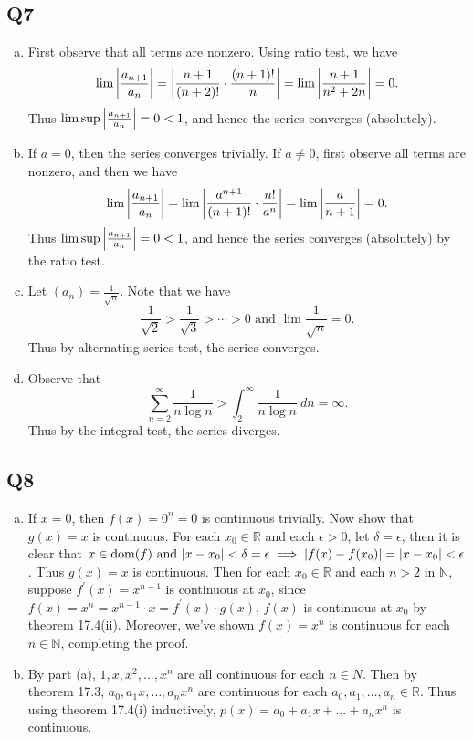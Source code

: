 \documentclass[12pt,lettersize]{article}
\newcommand{\R}{\mathbb{R}}
\newcommand{\N}{\mathbb{N}}
\DeclareMathOperator{\dom}{dom}
\begin{document}
	\subsection*{Q7}
	\begin{enumerate}[(a)]
		\item First observe that all terms are nonzero. Using ratio test, we have
		\begin{displaymath}
			\lim\abs{\frac{a_{n+1}}{a_n}}=\abs{\frac{n+1}{(n+2)!}\cdot\frac{(n+1)!}{n}}=\lim\abs{\frac{n+1}{n^2+2n}}=0.
		\end{displaymath}
		Thus $\lim\sup\abs{\frac{a_{n+1}}{a_n}}=0<1$, and hence the series converges (absolutely). 
		\item If $a=0$, then the series converges trivially. If $a\neq 0$, first observe all terms are nonzero, and then we have
		\begin{displaymath}
			\lim\abs{\frac{a_{n+1}}{a_n}}=\lim\abs{\frac{a^{n+1}}{(n+1)!}\cdot\frac{n!}{a^n}}=\lim\abs{\frac{a}{n+1}}=0.
		\end{displaymath}
		Thus $\lim\sup\abs{\frac{a_{n+1}}{a_n}}=0<1$, and hence the series converges (absolutely) by the ratio test.
		\item Let $(a_n)=\frac{1}{\sqrt{n}}$. Note that we have
		\begin{displaymath}
		\frac{1}{\sqrt{2}}>\frac{1}{\sqrt{3}}>\cdots>0\text{ and }\lim\frac{1}{\sqrt{n}}=0.
		\end{displaymath}
		Thus by alternating series test, the series converges.
		\item Observe that
		\begin{displaymath}
			\sum_{n=2}^{\infty}\frac{1}{n\log n}>\int_{2}^{\infty}\frac{1}{n\log n}\ dn=\infty.
		\end{displaymath}
		Thus by the integral test, the series diverges.
		
	\end{enumerate}
	\newpage
	
	\subsection*{Q8}
	\begin{enumerate}[(a)]
		\item If $x=0$, then $f(x)=0^n=0$ is continuous trivially. Now show that $g(x)=x$ is continuous. For each $x_0\in\R$ and each $\epsilon>0$, let $\delta=\epsilon$, then it is clear that $x\in\dom(f)\text{ and }|x-x_0|<\delta=\epsilon\implies \abs{f(x)-f(x_0)}=\abs{x-x_0}<\epsilon$. Thus $g(x)=x$ is continuous. Then for each $x_0\in\R$ and each $n>2$ in $\N$, suppose $f^\prime(x)=x^{n-1}$ is continuous at $x_0$, since $f(x)=x^n=x^{n-1}\cdot x=f^\prime(x)\cdot g(x)$, $f(x)$ is continuous at $x_0$ by theorem 17.4(ii). Moreover, we've shown $f(x)=x^n$ is continuous for each $n\in\N$, completing the proof.
		
		\item By part (a), $1,x,x^2,\dots,x^n$ are all continuous for each $n\in N$. Then by theorem 17.3, $a_0,a_1x,\dots,a_nx^n$ are continuous for each $a_0,a_1,\dots,a_n\in\R$. Thus using theorem 17.4(i) inductively, $p(x)=a_0+a_1x+\dots+a_nx^n$ is continuous.
	\end{enumerate}
	\newpage
	
\end{document}
